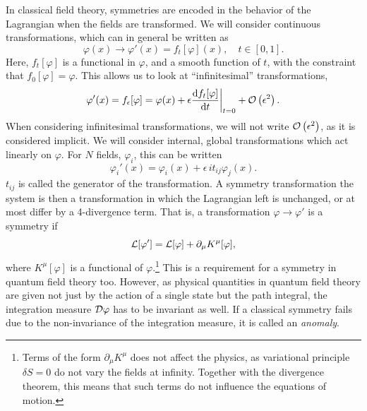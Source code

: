 In classical field theory, symmetries are encoded in the behavior of the Lagrangian when the fields are transformed.
We will consider continuous transformations, which can in general be written as
\begin{equation}
    \varphi(x) \longrightarrow \varphi'(x) = f_t[\varphi](x), \quad t \in [0, 1].
\end{equation}
Here, $f_t[\varphi]$ is a functional in $\varphi$, and a smooth function of $t$, with the constraint that $f_0[\varphi] = \varphi$.
This allows us to look at ``infinitesimal'' transformations,
\begin{equation}
    \label{infinitesimal transformation}
    \varphi'(x) = f_\epsilon[\varphi] 
    = \varphi(x) + \epsilon \diff{ f_t[\varphi] }{t}\bigg |_{t=0} + \Oh{\epsilon}.
\end{equation}
When considering infinitesimal transformations, we will not write $\mathcal{O}\left(\epsilon^{2}\right)$, as it is considered implicit.
We will consider internal, global transformations which act linearly on $\varphi$.
For $N$ fields, $\varphi_i$, this can be written
\begin{equation}
    \label{linear field transformation}
    \varphi_i'(x) = \varphi_i(x) + \epsilon \, i t_{ij} \varphi_j(x).
\end{equation}
$t_{ij}$ is called the generator of the transformation.
A symmetry transformation the system is then a transformation in which the Lagrangian left is unchanged, or at most differ by a 4-divergence term.
That is, a transformation $\varphi \rightarrow \varphi'$ is a symmetry if 
\begin{equation}
    \mathcal{L}[\varphi'] = \mathcal{L}[\varphi] + \partial_\mu K^\mu[\varphi],
\end{equation}
where $K^\mu[\varphi]$ is a functional of $\varphi$.\footnote{Terms of the form $\partial_\mu K^\mu$ does not affect the physics, as variational principle $\delta S = 0$ do not vary the fields at infinity. Together with the divergence theorem, this means that such terms do not influence the equations of motion.}
This is a requirement for a symmetry in quantum field theory too.
However, as physical quantities in quantum field theory are given not just by the action of a single state but the path integral, the integration measure $\mathcal{D} \varphi$ has to be invariant as well.
If a classical symmetry fails due to the non-invariance of the integration measure, it is called an \emph{anomaly}.

